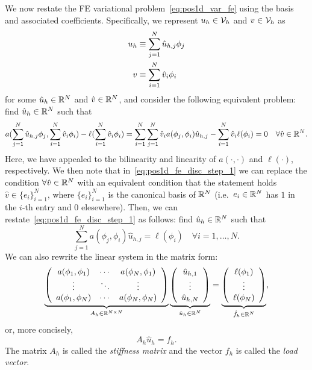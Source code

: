 We now restate the FE variational problem~\eqref{eq:pos1d_var_fe} using the basis and associated coefficients.  Specifically, we represent $u_h \in \calV_h$ and $v \in \calV_h$ as 
\begin{align}
  u_h &\equiv \sum_{j=1}^N \hat u_{h,j} \phi_j \label{eq:pos1d_uh_rep} \\
   v &\equiv \sum_{i=1}^N \hat v_i \phi_i \notag
\end{align}
for some $\hat u_h \in \RR^N$ and $\hat v \in \RR^N$, and consider the following equivalent problem: find $\hat u_h \in \RR^N$ such that
\begin{equation}
  a(\sum_{j=1}^N \hat u_{h,j} \phi_j, \sum_{i=1}^N \hat v_i \phi_i) - \ell(\sum_{i=1}^N \hat v_i \phi_i)
  =
  \sum_{i=1}^N \sum_{j=1}^N \hat v_i a(\phi_j, \phi_i) \hat u_{h,j} -
  \sum_{i=1}^N \hat v_i \ell(\phi_i) = 0 \quad \forall \hat v \in \RR^N.
  \label{eq:pos1d_fe_disc_step_1}
\end{equation}
Here, we have appealed to the bilinearity and linearity of $a(\cdot,\cdot)$ and $\ell(\cdot)$, respectively. We then note that in~\eqref{eq:pos1d_fe_disc_step_1} we can replace the condition $\forall \hat v \in \RR^N$ with an equivalent condition that the statement holds $\hat v \in \{e_i \}_{i=1}^N$, where $\{e_i\}_{i=1}^N$ is the canonical basis of $\RR^N$ (i.e.~$e_i \in \RR^N$ has $1$ in the $i$-th entry and $0$ elesewhere). Then, we can restate~\eqref{eq:pos1d_fe_disc_step_1} as follows: find $\hat u_h \in \RR^N$ such that
\begin{equation}
  \sum_{j=1}^N a(\phi_j,\phi_i) \hat u_{h,j} = \ell(\phi_i) \quad  \forall i = 1,\dots,N.
  \label{eq:pos1d_sys}
\end{equation}
We can also rewrite the linear system in the matrix form:
\begin{equation*}
  \underbrace{ \bmat{ccc}
  a(\phi_1,\phi_1) & \cdots & a(\phi_N,\phi_1) \\
  \vdots & \ddots & \vdots \\
  a(\phi_1,\phi_N) & \cdots & a(\phi_N,\phi_N) \\
  \emat
  }_{A_h \in \RR^{N \times N}}
  \underbrace{ \bmat{c} \hat u_{h,1}  \\ \vdots \\ \hat u_{h,N} \emat }_{\hat u_h \in \RR^N}
  =
  \underbrace{ \bmat{c} \ell(\phi_1) \\ \vdots \\ \ell(\phi_N) \emat }_{\hat f_h \in \RR^N},
\end{equation*}
or, more concisely,
\begin{equation*}
  A_h \hat u_h = f_h.
\end{equation*}
The matrix $A_h$ is called the \emph{stiffness matrix} and the vector $f_h$ is called the \emph{load vector}.%

